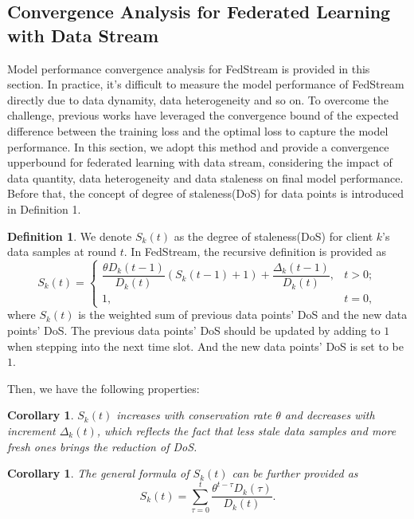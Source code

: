 \documentclass{article}
\theoremstyle{plain}
\newtheorem{corollary}[theorem]{Corollary}
\theoremstyle{definition}
\newtheorem{definition}[theorem]{Definition}
\theoremstyle{remark}
\begin{document}
\subsection{Convergence Analysis for Federated Learning with Data Stream}
Model performance convergence analysis for FedStream is provided in this section.
In practice, it's difficult to measure the model performance of FedStream directly due to data dynamity, data heterogeneity and so on.
To overcome the challenge, previous works have leveraged the convergence bound of the expected difference between the training loss and the optimal loss to capture the model performance.
In this section, we adopt this method and provide a convergence upperbound for federated learning with data stream, considering the impact of data quantity, data heterogeneity and data staleness on final model performance.
Before that, the concept of degree of staleness(DoS) for data points is introduced in Definition 1.
\begin{definition}
  We denote $S_k(t)$ as the degree of staleness(DoS) for client $k$'s data samples at round $t$. In FedStream, the recursive definition is provided as 
  \begin{equation}
    S_k(t) = 
    \begin{cases}
      \dfrac{\theta D_k(t-1)}{D_k(t)}(S_k(t-1) + 1) + \dfrac{\Delta_k(t-1)}{D_k(t)}, & t > 0; \\
      1, & t = 0,
    \end{cases}
  \end{equation}
  where $S_k(t)$ is the weighted sum of previous data points' DoS and the new data points' DoS.
  The previous data points' DoS should be updated by adding to $1$ when stepping into the next time slot. And the new data points' DoS is set to be $1$.
\end{definition}

Then, we have the following properties:
\begin{corollary}
  $S_k(t)$ increases with conservation rate $\theta$ and decreases with increment $\Delta_k(t)$, which reflects the fact that less stale data samples and more fresh ones brings the reduction of DoS.
\end{corollary}

\begin{corollary}
  The general formula of $S_k(t)$ can be further provided as
  \begin{equation}
    S_k(t) = \sum_{\tau=0}^{t} \frac{\theta^{t-\tau} D_k(\tau)}{D_k(t)}.    
  \end{equation}
\end{corollary}
\end{document}

